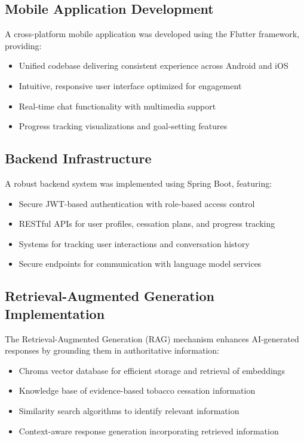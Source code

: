 \subsection{Mobile Application Development}

A cross-platform mobile application was developed using the Flutter framework, providing:

\begin{itemize}
    \item Unified codebase delivering consistent experience across Android and iOS
    \item Intuitive, responsive user interface optimized for engagement
    \item Real-time chat functionality with multimedia support
    \item Progress tracking visualizations and goal-setting features
\end{itemize}

\subsection{Backend Infrastructure}

A robust backend system was implemented using Spring Boot, featuring:

\begin{itemize}
    \item Secure JWT-based authentication with role-based access control
    \item RESTful APIs for user profiles, cessation plans, and progress tracking
    \item Systems for tracking user interactions and conversation history
    \item Secure endpoints for communication with language model services
\end{itemize}

\subsection{Retrieval-Augmented Generation Implementation}

The Retrieval-Augmented Generation (RAG) mechanism enhances AI-generated responses by grounding them in authoritative information:

\begin{itemize}
    \item Chroma vector database for efficient storage and retrieval of embeddings
    \item Knowledge base of evidence-based tobacco cessation information
    \item Similarity search algorithms to identify relevant information
    \item Context-aware response generation incorporating retrieved information
\end{itemize}

